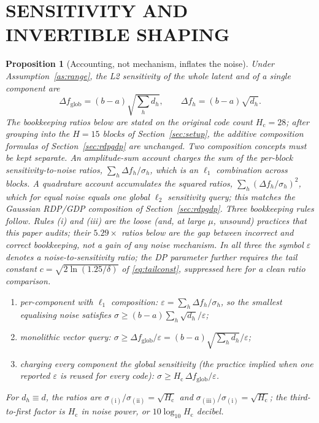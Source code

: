 \documentclass{ieeetj}
\theoremstyle{plain}
\newtheorem{proposition}{Proposition}
\theoremstyle{definition}
\begin{document}
\section{SENSITIVITY AND INVERTIBLE SHAPING}
\label{sec:sensitivity}

\begin{proposition}[Accounting, not mechanism, inflates the noise]
\label{pr:inflation}
Under Assumption~\ref{as:range}, the L2 sensitivity of the whole latent and of
a single component are
\begin{equation}
\Delta f_{\mathrm{glob}}=(b-a)\sqrt{{\textstyle\sum_h d_h}},
\qquad
\Delta f_h=(b-a)\sqrt{d_h}.
\label{eq:sens}
\end{equation}
The bookkeeping ratios below are stated on the original code count
$H_{\mathrm c}=28$; after grouping into the $H=15$ blocks of
Section~\ref{sec:setup}, the additive composition formulas of
Section~\ref{sec:rdpgdp} are unchanged. Two composition concepts must be kept
separate. An \emph{amplitude-sum} account charges the sum of the per-block
sensitivity-to-noise ratios, $\sum_h\Delta f_h/\sigma_h$, which is an $\ell_1$
combination across blocks. A \emph{quadrature} account accumulates the squared
ratios, $\sum_h(\Delta f_h/\sigma_h)^2$, which for equal noise equals one global
$\ell_2$ sensitivity query; this matches the Gaussian RDP/GDP composition of
Section~\ref{sec:rdpgdp}. Three bookkeeping rules follow. Rules (i) and (iii)
are the loose (and, at large $\mu$, unsound) practices that this paper audits;
their $5.29\times$ ratios below are the gap between incorrect and correct
bookkeeping, not a gain of any noise mechanism. In all three the symbol
$\varepsilon$ denotes a noise-to-sensitivity ratio; the DP parameter further
requires the tail constant $c=\sqrt{2\ln(1.25/\delta)}$ of
\eqref{eq:tailconst}, suppressed here for a clean ratio comparison.
\begin{enumerate}
\item[(i)] \emph{per-component with $\ell_1$ composition:}
$\varepsilon=\sum_{h}\Delta f_h/\sigma_h$, so the smallest equalising noise
satisfies $\sigma\ge(b-a)\textstyle\sum_h\sqrt{d_h}/\varepsilon$;
\item[(ii)] \emph{monolithic vector query:}
$\sigma\ge\Delta f_{\mathrm{glob}}/\varepsilon
=(b-a)\sqrt{{\textstyle\sum_h d_h}}/\varepsilon$;
\item[(iii)] \emph{charging every component the global sensitivity} (the
practice implied when one reported $\varepsilon$ is reused for every code):
$\sigma\ge H_{\mathrm c}\,\Delta f_{\mathrm{glob}}/\varepsilon$.
\end{enumerate}
For $d_h\equiv d$, the ratios are
$\sigma_{\mathrm{(i)}}/\sigma_{\mathrm{(ii)}}=\sqrt{H_{\mathrm c}}$ and
$\sigma_{\mathrm{(iii)}}/\sigma_{\mathrm{(i)}}=\sqrt{H_{\mathrm c}}$; the
third-to-first factor is $H_{\mathrm c}$ in noise power, or
$10\log_{10}H_{\mathrm c}$ decibel.
\end{proposition}
\end{document}
